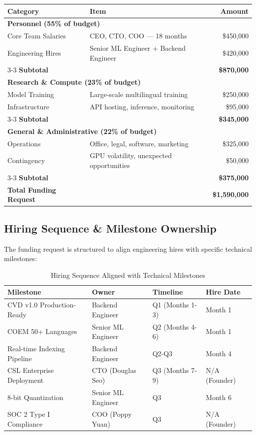 \begin{table}[ht]
\centering
\begin{tabular}{p{4.5cm} p{7cm} r}
\hline
\textbf{Category} & \textbf{Item} & \textbf{Amount} \\
\hline
\multicolumn{3}{l}{\textbf{Personnel (55\% of budget)}} \\
\hline
Core Team Salaries & CEO, CTO, COO — 18 months & \$450,000 \\
Engineering Hires & Senior ML Engineer + Backend Engineer & \$420,000 \\
\cline{3-3}
\textbf{Subtotal} & & \textbf{\$870,000} \\
\hline
\multicolumn{3}{l}{\textbf{Research \& Compute (23\% of budget)}} \\
\hline
Model Training & Large-scale multilingual training & \$250,000 \\
Infrastructure & API hosting, inference, monitoring & \$95,000 \\
\cline{3-3}
\textbf{Subtotal} & & \textbf{\$345,000} \\
\hline
\multicolumn{3}{l}{\textbf{General \& Administrative (22\% of budget)}} \\
\hline
Operations & Office, legal, software, marketing & \$325,000 \\
Contingency & GPU volatility, unexpected opportunities & \$50,000 \\
\cline{3-3}
\textbf{Subtotal} & & \textbf{\$375,000} \\
\hline
\hline
\textbf{Total Funding Request} & & \textbf{\$1,590,000} \\
\hline
\end{tabular}
\end{table}

\subsection{Hiring Sequence \& Milestone Ownership}

The funding request is structured to align engineering hires with specific technical milestones:

\begin{table}[ht]
\centering
\small
\begin{tabular}{|l|l|l|l|}
\hline
\textbf{Milestone} & \textbf{Owner} & \textbf{Timeline} & \textbf{Hire Date} \\
\hline
CVD v1.0 Production-Ready & Backend Engineer & Q1 (Months 1-3) & Month 1 \\
\hline
COEM 50+ Languages & Senior ML Engineer & Q2 (Months 4-6) & Month 1 \\
\hline
Real-time Indexing Pipeline & Backend Engineer & Q2-Q3 & Month 4 \\
\hline
CSL Enterprise Deployment & CTO (Douglas Seo) & Q3 (Months 7-9) & N/A (Founder) \\
\hline
8-bit Quantization & Senior ML Engineer & Q3 & Month 6 \\
\hline
SOC 2 Type I Compliance & COO (Poppy Yuan) & Q3 & N/A (Founder) \\
\hline
\end{tabular}
\caption{Hiring Sequence Aligned with Technical Milestones}
\end{table}

